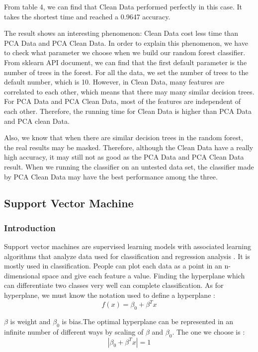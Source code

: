 \documentclass[sigconf]{acmart}
\begin{document}
From table 4, we can find that Clean Data performed perfectly in this case. It takes the shortest time and reached a 0.9647 accuracy.

The result shows an interesting phenomenon: Clean Data cost less time than PCA Data and PCA Clean Data. In order to explain this phenomenon, we have to check what parameter we choose when we build our random forest classifier. From sklearn API document, we can find that the first default parameter is the number of trees in the forest. For all the data, we set the number of trees to the default number, which is 10. However, in Clean Data, many features are correlated to each other, which means that there may many similar decision trees. For PCA Data and PCA Clean Data, most of the features are independent of each other. Therefore, the running time for Clean Data is higher than PCA Data and PCA clean Data. 

Also, we know that when there are similar decision trees in the random forest, the real results may be masked. Therefore, although the Clean Data have a really high accuracy, it may still not as good as the PCA Data and PCA Clean Data result. When we running the classifier on an untested data set, the classifier made by PCA Clean Data may have the best performance among the three.

\subsection{Support Vector Machine}

\subsubsection{Introduction}

Support vector machines are supervised learning models with associated learning algorithms that analyze data used for classification and regression analysis \cite{wiki.svm}. It is mostly used in classification. People can plot each data as a point in an n-dimensional space and give each feature a value. Finding the hyperplane which can differentiate two classes very well can complete classification. As for hyperplane, we must know the notation used to define a hyperplane \cite{svm.form}:
\begin{equation*}
f(x) = \beta_0 + \beta^Tx
\end{equation*}

$\beta$ is weight and $\beta_0$ is bias.The optimal hyperplane can be represented in an infinite number of different ways by scaling of $\beta$ and $\beta_0$. The one we choose is \cite{svm.form}:
\begin{equation*}
    |\beta_0 + \beta^Tx| = 1
\end{equation*}
\end{document}
